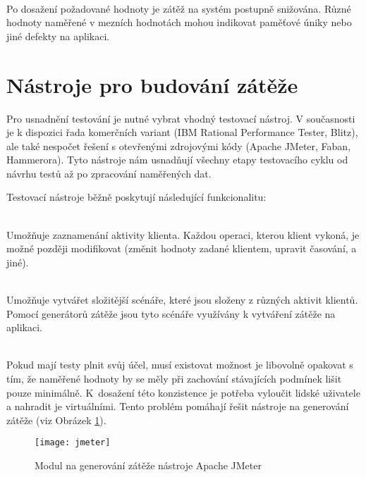 \documentclass[122pt,oneside]{fithesis}
\begin{document}
\vspace{5 mm}
\\\indent Po dosažení požadované hodnoty je zátěž na systém postupně snižována. Různé hodnoty naměřené v mezních hodnotách mohou indikovat paměťové úniky nebo jiné defekty na aplikaci.

\section{Nástroje pro budování zátěže}

Pro usnadnění testování je nutné vybrat vhodný testovací nástroj. V současnosti je k dispozici řada komerčních variant (IBM Rational Performance Tester, Blitz), ale také nespočet řešení s otevřenými zdrojovými kódy (Apache JMeter, Faban, Hammerora). Tyto nástroje nám usnadňují všechny etapy testovacího cyklu od návrhu testů až po zpracování naměřených dat. 

Testovací nástroje běžně poskytují následující funkcionalitu:

\vspace{5 mm}
\\\indent Umožňuje zaznamenání aktivity klienta. Každou operaci, kterou klient vykoná, je možné později modifikovat (změnit hodnoty zadané klientem, upravit časování, a jiné).

\vspace{5 mm}
\\\indent Umožňuje vytvářet složitější scénáře, které jsou složeny z různých aktivit klientů. Pomocí generátorů zátěže jsou tyto scénáře využívány k vytváření zátěže na aplikaci.

\vspace{5 mm}
\\\indent Pokud mají testy plnit svůj účel, musí existovat možnost je libovolně opakovat s tím, že naměřené hodnoty by se měly při zachování stávajících podmínek lišit pouze minimálně. K~dosažení této konzistence je potřeba vyloučit lidské uživatele a nahradit je virtuálními. Tento problém pomáhají řešit nástroje na generování zátěže (viz Obrázek \ref{img:jmeter}).

\begin{figure}[!ht]
\centering
\texttt{[image: jmeter]}
\caption{Modul na generování zátěže nástroje Apache JMeter}
\label{img:jmeter}
\end{figure}
\end{document}
